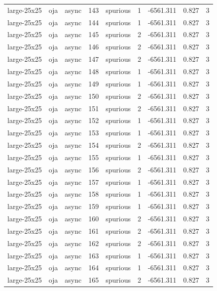 \begin{tabular}{lllrlrrrr}
large-25x25 & oja & async & 143 & spurious & 1 & -6561.311 & 0.827 & 3 \\
large-25x25 & oja & async & 144 & spurious & 1 & -6561.311 & 0.827 & 3 \\
large-25x25 & oja & async & 145 & spurious & 2 & -6561.311 & 0.827 & 3 \\
large-25x25 & oja & async & 146 & spurious & 2 & -6561.311 & 0.827 & 3 \\
large-25x25 & oja & async & 147 & spurious & 2 & -6561.311 & 0.827 & 3 \\
large-25x25 & oja & async & 148 & spurious & 1 & -6561.311 & 0.827 & 3 \\
large-25x25 & oja & async & 149 & spurious & 1 & -6561.311 & 0.827 & 3 \\
large-25x25 & oja & async & 150 & spurious & 2 & -6561.311 & 0.827 & 3 \\
large-25x25 & oja & async & 151 & spurious & 2 & -6561.311 & 0.827 & 3 \\
large-25x25 & oja & async & 152 & spurious & 1 & -6561.311 & 0.827 & 3 \\
large-25x25 & oja & async & 153 & spurious & 1 & -6561.311 & 0.827 & 3 \\
large-25x25 & oja & async & 154 & spurious & 2 & -6561.311 & 0.827 & 3 \\
large-25x25 & oja & async & 155 & spurious & 1 & -6561.311 & 0.827 & 3 \\
large-25x25 & oja & async & 156 & spurious & 2 & -6561.311 & 0.827 & 3 \\
large-25x25 & oja & async & 157 & spurious & 1 & -6561.311 & 0.827 & 3 \\
large-25x25 & oja & async & 158 & spurious & 1 & -6561.311 & 0.827 & 3 \\
large-25x25 & oja & async & 159 & spurious & 1 & -6561.311 & 0.827 & 3 \\
large-25x25 & oja & async & 160 & spurious & 2 & -6561.311 & 0.827 & 3 \\
large-25x25 & oja & async & 161 & spurious & 2 & -6561.311 & 0.827 & 3 \\
large-25x25 & oja & async & 162 & spurious & 2 & -6561.311 & 0.827 & 3 \\
large-25x25 & oja & async & 163 & spurious & 1 & -6561.311 & 0.827 & 3 \\
large-25x25 & oja & async & 164 & spurious & 1 & -6561.311 & 0.827 & 3 \\
large-25x25 & oja & async & 165 & spurious & 2 & -6561.311 & 0.827 & 3 \\

\end{tabular}
